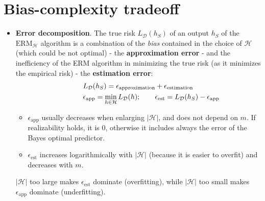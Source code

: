 \documentclass[../template.tex]{subfiles}
\begin{document}
\section{Bias-complexity tradeoff}
\begin{itemize}
    \item \textbf{Error decomposition}. The true risk $L_{\mathcal{D}}(h_S)$ of an output $h_S$ of the $\mathrm{ERM}_{\mathcal{H}}$ algorithm is a combination of the \textit{bias} contained in the choice of $\mathcal{H}$ (which could be not optimal) - the \textbf{approximation error} - and the inefficiency of the ERM algorithm in minimizing the true risk (as it minimizes the empirical risk) - the \textbf{estimation error}:
    \begin{align*}
        L_{\mathcal{D}}(h_S) = \epsilon_{\mathrm{approximation}} + \epsilon_{\mathrm{estimation}} \span \\
        \epsilon_{\mathrm{app}} = \min_{h \in \mathcal{H}} L_{\mathcal{D}}(h); \qquad \epsilon_{\mathrm{est}} = L_{\mathcal{D}} (h_S) - \epsilon_{\mathrm{app}}
    \end{align*}
    \begin{itemize}
        \item $\epsilon_{\mathrm{app}}$ usually decreases when enlarging $|\mathcal{H}|$, and does not depend on $m$. If realizability holds, it is $0$, otherwise it includes always the error of the Bayes optimal predictor.
        \item $\epsilon_{\mathrm{est}}$ increases logarithmically with $|\mathcal{H}|$ (because it is easier to overfit) and decreases with $m$.
    \end{itemize}    
    $|\mathcal{H}|$ too large makes $\epsilon_{\mathrm{est}}$ dominate (overfitting), while $|\mathcal{H}|$ too small makes $\epsilon_{\mathrm{app}}$ dominate (underfitting). 
\end{itemize}
\end{document}

